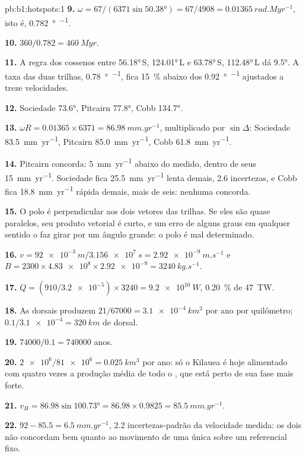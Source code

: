 \begin{solution}{pb:b1:hotspots:1}
\textbf{9.} $\omega = 67/(6371\sin\ang{50.38}) = 67/4908 =
\qty{0.01365}{rad.Myr^{-1}}$, isto é, \qty{0.782}{\degree\per\Myr}.

\textbf{10.} $360/0.782 = \qty{460}{Myr}$.

\textbf{11.} A regra dos cossenos entre \ang{56.18}\,S, \ang{124.01}\,L e
\ang{63.78}\,S, \ang{112.48}\,L dá \ang{9.5}. A taxa das duas trilhas, \qty{0.78}{\degree\per\Myr}, fica \qty{15}{\percent} abaixo dos
\qty{0.92}{\degree\per\Myr} ajustados a treze velocidades.

\textbf{12.} Sociedade \ang{73.6}, Pitcairn \ang{77.8}, Cobb \ang{134.7}.

\textbf{13.} $\omega R = 0.01365\times6371 = \qty{86.98}{mm.yr^{-1}}$, multiplicado por
$\sin\Delta$: Sociedade \qty{83.5}{mm.yr^{-1}}, Pitcairn
\qty{85.0}{mm.yr^{-1}}, Cobb \qty{61.8}{mm.yr^{-1}}.

\textbf{14.} Pitcairn concorda: \qty{5}{mm.yr^{-1}} abaixo do medido, dentro de seus \qty{15}{mm.yr^{-1}}. Sociedade fica \qty{25.5}{mm.yr^{-1}} lenta demais, 2.6 incertezas, e Cobb fica \qty{18.8}{mm.yr^{-1}} rápida demais, mais de seis: nenhuma concorda.

\textbf{15.} O polo é perpendicular aos dois vetores das trilhas. Se eles são quase paralelos, seu produto vetorial é curto, e um erro de alguns graus em qualquer sentido o faz girar por um ângulo grande: o polo é mal determinado.

\textbf{16.} $v = \qty{92e-3}{m}/\qty{3.156e7}{s} = \qty{2.92e-9}{m.s^{-1}}$
e $B = 2300\times\num{4.83e8}\times\num{2.92e-9} = \qty{3240}{kg.s^{-1}}$.

\textbf{17.} $Q = (910/\num{3.2e-5})\times3240 = \qty{9.2e10}{W}$,
\qty{0.20}{\percent} de \qty{47}{TW}.

\textbf{18.} As dorsais produzem $21/67000 = \qty{3.1e-4}{km^3}$ por ano por
quilômetro; $0.1/\num{3.1e-4} = \qty{320}{km}$ de dorsal.

\textbf{19.} $74000/0.1 = \num{740000}$ anos.

\textbf{20.} $\num{2e6}/\num{81e6} = \qty{0.025}{km^3}$ por ano: só o Kilauea é hoje alimentado com quatro vezes a produção média de todo o , que está perto de sua fase mais forte.

\textbf{21.} $v_H = 86.98\sin\ang{100.73} = 86.98\times0.9825 =
\qty{85.5}{mm.yr^{-1}}$.

\textbf{22.} $92 - 85.5 = \qty{6.5}{mm.yr^{-1}}$, 2.2 incertezas-padrão da velocidade medida: os dois  não concordam bem quanto ao movimento de uma única  sobre um referencial fixo.


\end{solution}
